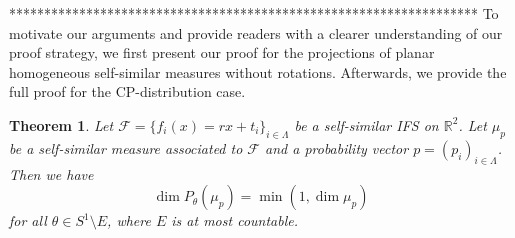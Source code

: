 \documentclass[a4paper,11pt]{amsart}
\newtheorem{theorem}{Theorem}[section]
\theoremstyle{definition}
\numberwithin{equation}{section}
\def\R{\mathbb R}
\begin{document}
\iffalse
{\color{red}*******************************************************************}
To motivate our arguments and provide readers with a clearer understanding of our proof strategy, we first present our proof for the projections of planar homogeneous self-similar measures without rotations.  Afterwards, we provide the full proof for the CP-distribution case.

\begin{theorem}\label{thm: proj-self-similar-1}
Let $\mathcal{F}=\{f_i(x)=rx +t_i\}_{i\in \Lambda}$ be a self-similar IFS on $\R^2$.  Let $\mu_p$ be a self-similar measure associated to $\mathcal{F} $ and a probability vector $p=(p_i)_{i\in \Lambda}$. Then we have
\[
\dim P_\theta(\mu_p)=\min(1,\dim \mu_p)
\]
for all $\theta\in S^1\setminus E$,  where $E$ is at most countable.
\end{theorem}
\end{document}
